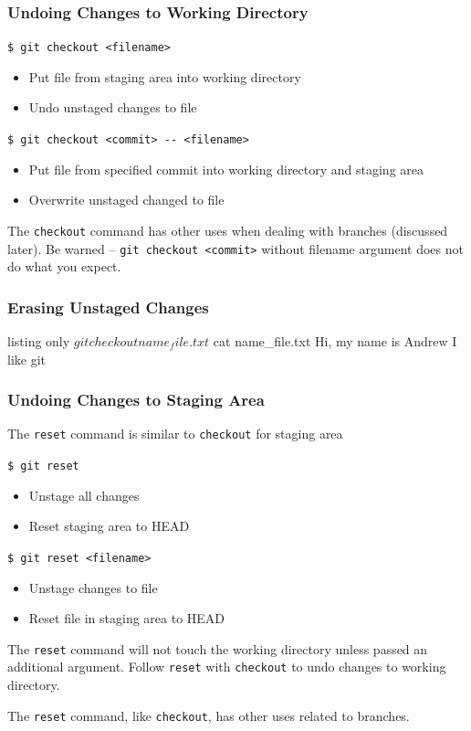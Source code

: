 \documentclass[english,compress]{beamer}
\begin{document}
\begin{frame}[fragile]
    \frametitle{Undoing Changes to Working Directory}

    \verb|$ git checkout <filename>|
    \begin{itemize}
        \item Put file from staging area into working directory
        \item Undo unstaged changes to file
    \end{itemize}
    \verb|$ git checkout <commit> -- <filename>|
    \begin{itemize}
        \item Put file from specified commit into working directory and
              staging area
        \item Overwrite unstaged changed to file
    \end{itemize}

    The \verb|checkout| command has other uses when dealing with branches
    (discussed later). Be warned -- \verb|git checkout <commit>| without
    filename argument does not do what you expect.
\end{frame}

\begin{frame}[fragile]
    \frametitle{Erasing Unstaged Changes}
    \begin{tcblisting}{listing only}
$ git checkout name_file.txt
$ cat name_file.txt 
Hi, my name is Andrew
I like git
    \end{tcblisting}
\end{frame}

\begin{frame}[fragile]
    \frametitle{Undoing Changes to Staging Area}

    The \verb|reset| command is similar to \verb|checkout| for staging area

    \verb|$ git reset|
    \begin{itemize}
        \item Unstage all changes
        \item Reset staging area to HEAD
    \end{itemize}
    \verb|$ git reset <filename>|
    \begin{itemize}
        \item Unstage changes to file
        \item Reset file in staging area to HEAD
    \end{itemize}

    The \verb|reset| command will not touch the working directory unless
    passed an additional argument. Follow \verb|reset| with \verb|checkout|
    to undo changes to working directory.

    The \verb|reset| command, like \verb|checkout|, has other uses related
    to branches.
\end{frame}
\end{document}
